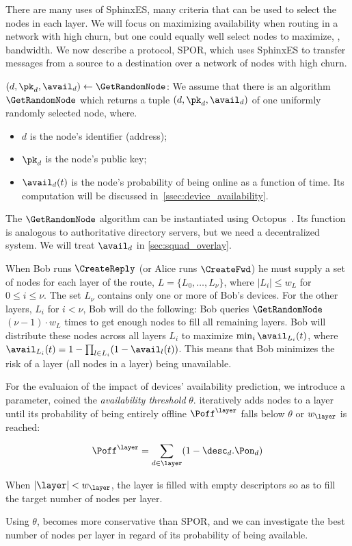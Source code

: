 There are many uses of SphinxES, many criteria that can be used to select the 
nodes in each layer.
We will focus on maximizing availability when routing in a network with high 
churn, but one could equally well select nodes to maximize, \eg, bandwidth.
We now describe a protocol, \ac{SPOR}, which uses SphinxES to transfer messages 
from a source to a destination over a network of nodes with high churn.

\((d, \pk_d, \avail_d)\gets \GetRandomNode\): We assume that there is an 
algorithm \(\GetRandomNode\) which returns a tuple \((d, \pk_d, \avail_d)\) of 
one uniformly randomly selected node, where.
\begin{itemize}
  \item \(d\) is the node's identifier (address);
  \item \(\pk_d\) is the node's public key;
  \item  \(\avail_d(t)\) is the node's probability of being online as a function of time. 
  Its computation will be discussed in~\ref{ssec:device_availability}.
\end{itemize}
The \(\GetRandomNode\) algorithm can be instantiated using \eg
Octopus~\cite{Octopus}. Its function is analogous to  authoritative 
directory servers, but we need a decentralized system. We will treat 
\(\avail_d\) in \cref{sec:squad_overlay}.

When Bob runs \(\CreateReply\) (or Alice runs \(\CreateFwd\)) he must supply a 
set of nodes for each layer of the route, \(L = \{L_0, \dotsc, L_\nu\}\), where 
\(|L_i| \leq w_L\) for \(0\leq i\leq \nu\).
The set \(L_\nu\) contains only one or more of Bob's devices.
For the other layers, \(L_i\) for \(i < \nu\), Bob will do the following:
Bob queries \(\GetRandomNode\) \((\nu-1)\cdot w_L\) times to get enough nodes 
to fill all remaining layers.
Bob will distribute these nodes across all layers \(L_i\) to maximize \(\min_i 
  \avail_{L_i}(t)\), where \(\avail_{L_i}(t) = 1-\prod_{l\in L_i} 
  (1-\avail_l(t))\).
This means that Bob minimizes the risk of a layer (\ie all nodes in a layer) 
being unavailable.

For the evaluaion of the impact of devices' availability prediction, we introduce a parameter, coined the \emph{availability threshold} $\theta$. 
\CreateLayer iteratively adds nodes to a layer \layer until its probability of being entirely offline $\Poff^\layer$ falls below $\theta$ or $w_\layer$ is reached:

$$ \Poff^\layer = \sum\limits_{d \in \layer}(1 - \desc_d.\Pon_d) $$

When $|\layer| < w_\layer$, the layer is filled with empty descriptors so as to fill the target number of nodes per layer.

Using $\theta$, \name becomes more conservative than \ac{SPOR}, and we can investigate the best number of nodes per layer in regard of its probability of being available.